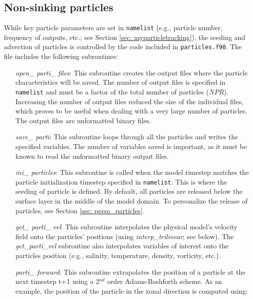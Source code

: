 \documentclass[12pt,letterpaper,titlepage]{article}
\begin{document}
\subsection{Non-sinking particles}
While key particle parameters are set in \texttt{namelist} (e.g., particle number, frequency of outputs, etc.; see Section \ref{sec: myparticletracking}), the seeding and advection of particles is controlled by the code included in \texttt{particles.f90}. The file includes the following subroutines:

\begin{itemize}
	
	\item[\textit{open\_ parti\_ files}:] This subroutine creates the output files where the particle characteristics will be saved. The number of output files is specified in \texttt{namelist} and must be a factor of the total number of particles ($NPR$). Increasing the number of output files reduced the size of the individual files, which proves to be useful when dealing with a very large number of particles. The output files are unformatted binary files.
	
	\item[\textit{save\_ parti}:] This subroutine loops through all the particles and writes the specified variables. The number of variables saved is important, as it must be known to read the unformatted binary output files.
	
	\item[\textit{ini\_ particles}:] This subroutine is called when the model timestep matches the particle initialization timestep specified in \texttt{namelist}. This is where the seeding of particle is defined. By default, all particles are released below the surface layer in the middle of the model domain. To personalize the release of particles, see Section \ref{sec: perso_particles}.
	
	\item[\textit{get\_ parti\_ vel}:] This subroutine interpolates the physical model's velocity field onto the particles' positions (using \textit{interp\_trilinear}; see below). The \textit{get\_parti\_vel} subroutine also interpolates variables of interest onto the particles position (e.g., salinity, temperature, density, vorticity, etc.).
	
	\item[\textit{parti\_ forward}:] This subroutine extrapolates the position of a particle at the next timestep t+1 using a 2$^{nd}$ order Adams-Bashforth scheme. As an example, the position of the particle in the zonal direction is computed using:
	

\end{itemize}
\end{document}
